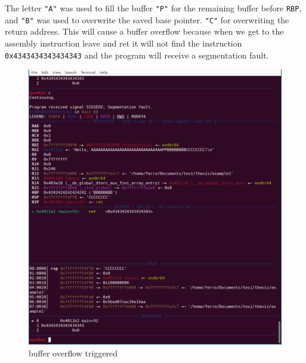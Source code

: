     The letter \texttt{"A"} was used to fill the buffer \texttt{"P"} for the remaining buffer before \texttt{RBP}, and \texttt{"B"} was used to overwrite the saved base pointer.\newline
    \texttt{"C"} for overwriting the return address.\newline
    This will cause a buffer overflow because when we get to the assembly instruction leave and ret it will not find the instruction \texttt{0x4343434343434343} and the program will receive a segmentation fault.
    \begin{figure}[h]
        \centering
        \includegraphics[width=0.7\linewidth]{Images/example1.png}
        \caption{buffer overflow triggered}
        \label{fig:bofongdb}
    \end{figure}
    \newpage
    
